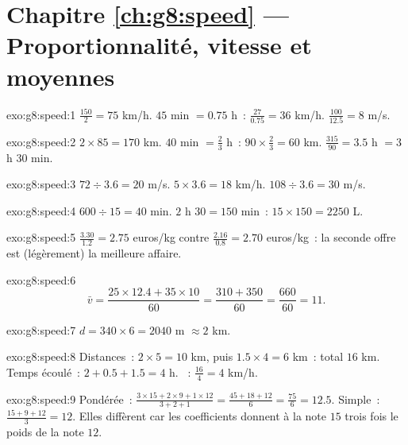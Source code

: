 \section*{Chapitre \ref{ch:g8:speed} --- Proportionnalité, vitesse et moyennes}

\begin{solution}{exo:g8:speed:1}
$\frac{150}{2} = 75$ km/h. \quad
$45$ min $= 0.75$ h~: $\frac{27}{0.75} = 36$ km/h. \quad
$\frac{100}{12.5} = 8$ m/s.
\end{solution}

\begin{solution}{exo:g8:speed:2}
$2 \times 85 = 170$ km. \quad
$40$ min $= \frac23$ h~: $90 \times \frac23 = 60$ km. \quad
$\frac{315}{90} = 3.5$ h $= 3$ h $30$ min.
\end{solution}

\begin{solution}{exo:g8:speed:3}
$72 \div 3.6 = 20$ m/s. \quad
$5 \times 3.6 = 18$ km/h. \quad
$108 \div 3.6 = 30$ m/s.
\end{solution}

\begin{solution}{exo:g8:speed:4}
$600 \div 15 = 40$ min. \quad
$2$ h $30 = 150$ min~: $15 \times 150 = 2250$ L.
\end{solution}

\begin{solution}{exo:g8:speed:5}
$\frac{3.30}{1.2} = 2.75$ euros/kg contre
$\frac{2.16}{0.8} = 2.70$ euros/kg~: la seconde offre est (légèrement)
la meilleure affaire.
\end{solution}

\begin{solution}{exo:g8:speed:6}
\[
\bar v = \frac{25 \times 12.4 + 35 \times 10}{60}
= \frac{310 + 350}{60} = \frac{660}{60} = 11 .
\]
\end{solution}

\begin{solution}{exo:g8:speed:7}
$d = 340 \times 6 = 2040$ m $\approx 2$ km.
\end{solution}

\begin{solution}{exo:g8:speed:8}
Distances~: $2 \times 5 = 10$ km, puis $1.5 \times 4 = 6$ km~: total
$16$ km. Temps écoulé~: $2 + 0.5 + 1.5 = 4$ h. ~:
$\frac{16}{4} = 4$ km/h.
\end{solution}

\begin{solution}{exo:g8:speed:9}
Pondérée~:
$\frac{3 \times 15 + 2 \times 9 + 1 \times 12}{3 + 2 + 1}
= \frac{45 + 18 + 12}{6} = \frac{75}{6} = 12.5$.
Simple~: $\frac{15 + 9 + 12}{3} = 12$. Elles diffèrent car les
coefficients donnent à la note $15$ trois fois le poids de la note
$12$.
\end{solution}


